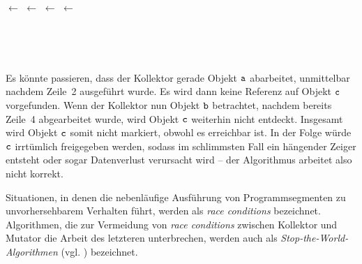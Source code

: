 \begin{center}
\begin{minipage}{0.3\textwidth}
	\centering
	\begin{algorithmic}[1]
		\State {} $\gets$ 
		\State {} $\gets$ \Null
		\State {} $\gets$ 
		\State {} $\gets$ \Null
	\end{algorithmic}
\end{minipage}~
\begin{minipage}{0.3\textwidth}
	\centering
	
\end{minipage}~
\begin{minipage}{0.3\textwidth}
	\centering
	
\end{minipage}
\end{center}

Es könnte passieren, dass der Kollektor gerade Objekt $\texttt{a}$ abarbeitet, unmittelbar nachdem Zeile~2 ausgeführt wurde.
Es wird dann keine Referenz auf Objekt $\texttt{c}$ vorgefunden.
Wenn der Kollektor nun Objekt $\texttt{b}$ betrachtet, nachdem bereits Zeile~4 abgearbeitet wurde, wird Objekt $\texttt{c}$ weiterhin nicht entdeckt.
Insgesamt wird Objekt $\texttt{c}$ somit nicht markiert, obwohl es erreichbar ist.
In der Folge würde $\texttt{c}$ irrtümlich freigegeben werden, sodass im schlimmsten Fall ein hängender Zeiger entsteht oder sogar Datenverlust verursacht wird -- der Algorithmus arbeitet also nicht korrekt.

Situationen, in denen die nebenläufige Ausführung von Programmsegmenten zu unvorhersehbarem Verhalten führt, werden als \textit{race conditions} bezeichnet.
Algorithmen, die zur Vermeidung von \textit{race conditions} zwischen Kollektor und Mutator die Arbeit des letzteren unterbrechen, werden auch als \textit{Stop-the-World-Algorithmen} (vgl. \cite[S. 2]{levanoni2006}) bezeichnet.




